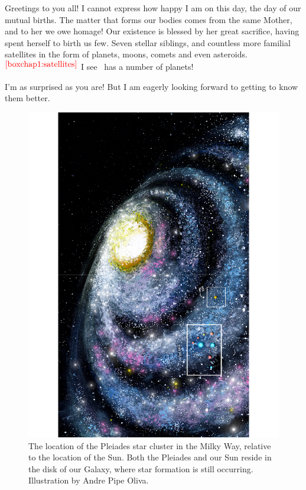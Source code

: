 \documentclass[main.tex]{subfiles}
\begin{document}

\par \Maia Greetings to you all!  I cannot express how happy I am on this day, the day of our mutual births.  The matter that forms our bodies comes from the same Mother, and to her we owe homage!  Our existence is blessed by her great sacrifice, having spent herself to birth us few.  Seven stellar siblings, and countless more familial satellites in the form of planets, moons, comets and even asteroids.$^{\textcolor{red}{\ref{boxchap1:satellites}}}$  I see \rmelectra~has a number of planets!

\par \Electra I'm as surprised as you are!  But I am eagerly looking forward to getting to know them better.

\begin{figure}
\includegraphics[width=\columnwidth,angle=270,origin=c]{ch1_5.pdf}
\caption{The location of the Pleiades star cluster in the Milky Way, relative to the location of the Sun.  Both the Pleiades and our Sun reside in the disk of our Galaxy, where star formation is still occurring.  Illustration by Andre Pipe Oliva.
\label{fig:fig5}}
\end{figure}
\end{document}
